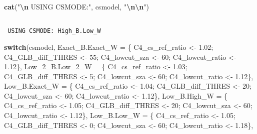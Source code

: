 \documentclass[
  10pt,
  a4paper,oneside]{article}
\newenvironment{Shaded}{\begin{snugshade}}{\end{snugshade}}
\newcommand{\AttributeTok}[1]{\textcolor[rgb]{0.13,0.29,0.53}{#1}}
\newcommand{\ControlFlowTok}[1]{\textcolor[rgb]{0.13,0.29,0.53}{\textbf{#1}}}
\newcommand{\DecValTok}[1]{\textcolor[rgb]{0.00,0.00,0.81}{#1}}
\newcommand{\FloatTok}[1]{\textcolor[rgb]{0.00,0.00,0.81}{#1}}
\newcommand{\FunctionTok}[1]{\textcolor[rgb]{0.13,0.29,0.53}{\textbf{#1}}}
\newcommand{\NormalTok}[1]{#1}
\newcommand{\OtherTok}[1]{\textcolor[rgb]{0.56,0.35,0.01}{#1}}
\newcommand{\SpecialCharTok}[1]{\textcolor[rgb]{0.81,0.36,0.00}{\textbf{#1}}}
\newcommand{\StringTok}[1]{\textcolor[rgb]{0.31,0.60,0.02}{#1}}
\begin{document}
\begin{Shaded}
\begin{Highlighting}[]
\FunctionTok{cat}\NormalTok{(}\StringTok{"}\SpecialCharTok{\textbackslash{}n}\StringTok{ USING CSMODE:"}\NormalTok{, csmodel, }\StringTok{"}\SpecialCharTok{\textbackslash{}n\textbackslash{}n}\StringTok{"}\NormalTok{)}
\end{Highlighting}
\end{Shaded}

\begin{verbatim}

 USING CSMODE: High_B.Low_W 
\end{verbatim}

\begin{Shaded}
\begin{Highlighting}[]
\ControlFlowTok{switch}\NormalTok{(csmodel,}
       \AttributeTok{Exact\_B.Exact\_W =}\NormalTok{ \{ C4\_cs\_ref\_ratio }\OtherTok{\textless{}{-}} \FloatTok{1.02}\NormalTok{; C4\_GLB\_diff\_THRES }\OtherTok{\textless{}{-}} \DecValTok{55}\NormalTok{; C4\_lowcut\_sza }\OtherTok{\textless{}{-}} \DecValTok{60}\NormalTok{; C4\_lowcut\_ratio }\OtherTok{\textless{}{-}} \FloatTok{1.12}\NormalTok{\},}
       \AttributeTok{Low\_2\_B.Low\_2\_W =}\NormalTok{ \{ C4\_cs\_ref\_ratio }\OtherTok{\textless{}{-}} \FloatTok{1.03}\NormalTok{; C4\_GLB\_diff\_THRES }\OtherTok{\textless{}{-}}  \DecValTok{5}\NormalTok{; C4\_lowcut\_sza }\OtherTok{\textless{}{-}} \DecValTok{60}\NormalTok{; C4\_lowcut\_ratio }\OtherTok{\textless{}{-}} \FloatTok{1.12}\NormalTok{\},}
       \AttributeTok{Low\_B.Exact\_W   =}\NormalTok{ \{ C4\_cs\_ref\_ratio }\OtherTok{\textless{}{-}} \FloatTok{1.04}\NormalTok{; C4\_GLB\_diff\_THRES }\OtherTok{\textless{}{-}} \DecValTok{20}\NormalTok{; C4\_lowcut\_sza }\OtherTok{\textless{}{-}} \DecValTok{60}\NormalTok{; C4\_lowcut\_ratio }\OtherTok{\textless{}{-}} \FloatTok{1.12}\NormalTok{\},}
       \AttributeTok{Low\_B.High\_W    =}\NormalTok{ \{ C4\_cs\_ref\_ratio }\OtherTok{\textless{}{-}} \FloatTok{1.05}\NormalTok{; C4\_GLB\_diff\_THRES }\OtherTok{\textless{}{-}} \DecValTok{20}\NormalTok{; C4\_lowcut\_sza }\OtherTok{\textless{}{-}} \DecValTok{60}\NormalTok{; C4\_lowcut\_ratio }\OtherTok{\textless{}{-}} \FloatTok{1.12}\NormalTok{\},}
       \AttributeTok{Low\_B.Low\_W     =}\NormalTok{ \{ C4\_cs\_ref\_ratio }\OtherTok{\textless{}{-}} \FloatTok{1.05}\NormalTok{; C4\_GLB\_diff\_THRES }\OtherTok{\textless{}{-}}  \DecValTok{0}\NormalTok{; C4\_lowcut\_sza }\OtherTok{\textless{}{-}} \DecValTok{60}\NormalTok{; C4\_lowcut\_ratio }\OtherTok{\textless{}{-}} \FloatTok{1.18}\NormalTok{\},}

\end{Highlighting}
\end{Shaded}
\end{document}
